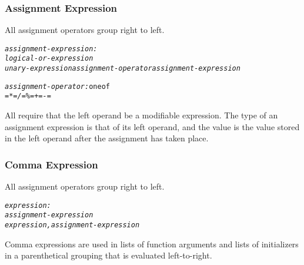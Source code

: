 \documentclass[12pt]{report}
\begin{document}
\subsubsection{Assignment Expression}
All assignment operators group right to left.
\begin{alltt}
    \textit{assignment-expression:}
        \textit{logical-or-expression}
        \textit{unary-expression assignment-operator assignment-expression}
              
    \textit{assignment-operator:} one of
        \textit{=     *=     /=     \%=     +=     -=}
\end{alltt}
\begin{doublespace}
All require that the left operand be a modifiable expression. The type of an assignment expression is that of its left operand, and the value is the value stored in the left operand after the assignment has taken place.
\end{doublespace}


\subsubsection{Comma Expression}
All assignment operators group right to left.
\begin{alltt}
         \textit{expression:}
              \textit{assignment-expression}
              \textit{expression , assignment-expression}
\end{alltt}
\begin{doublespace}
Comma expressions are used in lists of function arguments and lists of initializers in a parenthetical grouping that is evaluated left-to-right.
\end{doublespace}
\end{document}
